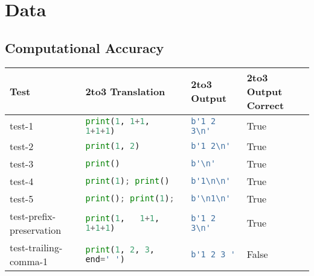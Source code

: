 \section{Data}
\label{appendix:Data}

\subsection{Computational Accuracy}
\label{appendix:Accuracy}

\begin{table}[h!]
    \centering
    \begin{tabular}{@{}l|lll@{}}
    \toprule
    Test                                  & 2to3 Translation                      & 2to3 Output                            & 2to3 Output Correct \\ \midrule
    test-1                               & \lstinline[language=Python, style=pythonstyle]|print(1, 1+1, 1+1+1)                 | & \lstinline[language=Python, style=pythonstyle]|b'1 2 3\n'  |            & True                \\
    test-2                               & \lstinline[language=Python, style=pythonstyle]|print(1, 2)                          | & \lstinline[language=Python, style=pythonstyle]|b'1 2\n'   |             & True                \\
    test-3                               & \lstinline[language=Python, style=pythonstyle]|print()                              | & \lstinline[language=Python, style=pythonstyle]|b'\n'    |               & True                \\
    test-4                               & \lstinline[language=Python, style=pythonstyle]|print(1); print()                    | & \lstinline[language=Python, style=pythonstyle]|b'1\n\n' |& True                \\
    test-5                               & \lstinline[language=Python, style=pythonstyle]|print(); print(1);                   | & \lstinline[language=Python, style=pythonstyle]|b'\n1\n' |& True                \\
    test-prefix-preservation            & \lstinline[language=Python, style=pythonstyle]|print(1,   1+1,   1+1+1)             | & \lstinline[language=Python, style=pythonstyle]|b'1 2 3\n'  |            & True                \\
    test-trailing-comma-1              & \lstinline[language=Python, style=pythonstyle]|print(1, 2, 3, end=' ')              | & \lstinline[language=Python, style=pythonstyle]|b'1 2 3 '   |                           & False               \\

\end{tabular}
\end{table}
